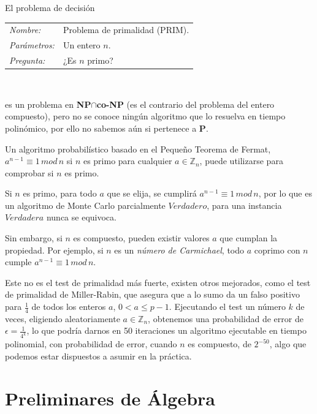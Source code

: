 \begin{example}
	El problema de decisión
	
	\begin{tabular}{|ll}
		\textit{Nombre:} & Problema de primalidad (PRIM). \\
		\textit{Parámetros:} & Un entero $n$. \\
		\textit{Pregunta:} & ¿Es $n$ primo? \\
	\end{tabular}
	\\
	\hfil
	
	es un problema en \textbf{NP}$\cap$\textbf{co-NP} (es el contrario del problema del entero compuesto), pero no se conoce ningún algoritmo que lo resuelva en tiempo polinómico, por ello no sabemos aún si pertenece a \textbf{P}.
	
	Un algoritmo probabilístico basado en el Pequeño Teorema de Fermat, $a^{n-1} \equiv 1 \, mod \, n$ si $n$ es primo para cualquier $a\in \mathbb{Z}_n$, puede utilizarse para comprobar si $n$ es primo.
	
	Si $n$ es primo, para todo $a$ que se elija, se cumplirá $a^{n-1} \equiv 1 \, mod \, n$, por lo que es un algoritmo de Monte Carlo parcialmente $Verdadero$, para una instancia $Verdadera$ nunca se equivoca.
	
	Sin embargo, si $n$ es compuesto, pueden existir valores $a$ que cumplan la propiedad. Por ejemplo, si $n$ es un \textit{número de Carmichael}, todo $a$ coprimo con $n$ cumple $a^{n-1} \equiv 1 \, mod \, n$.
	
	Este no es el test de primalidad más fuerte, existen otros mejorados, como el test de primalidad de Miller-Rabin, que asegura que a lo sumo da un falso positivo para $\frac{1}{4}$ de todos los enteros $a$, $0<a\leq p-1$. Ejecutando el test un número $k$ de veces, eligiendo aleatoriamente $a\in \mathbb{Z}_n$, obtenemos una probabilidad de error de $\epsilon=\frac{1}{4^k}$, lo que podría darnos en 50 iteraciones un algoritmo ejecutable en tiempo polinomial, con probabilidad de error, cuando $n$ es compuesto, de $2^{-50}$, algo que podemos estar dispuestos a asumir en la práctica.
	
\end{example}






%
%
%
%
%
%

\hfil



\section{Preliminares de Álgebra}

